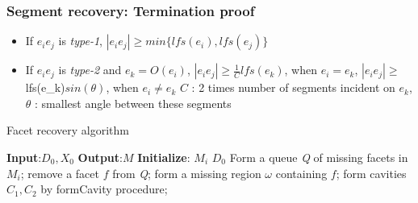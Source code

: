 \documentclass{beamer}
\begin{document}
\begin{frame}
\frametitle{Segment recovery: Termination proof}
\begin{itemize}
    \item If $e_{i}e_{j}$ is \textit{type-1}, \newline
    $|e_{i}e_{j}| \geq min\{lfs(e_i), lfs(e_j)\}$
    \item If $e_{i}e_{j}$ is \textit{type-2} and $e_{k} = O(e_i)$, \newline
    $|e_{i}e_{j}| \geq \frac{1}{C}lfs(e_k)$, when $e_{i} = e_{k}$, \newline
    $|e_{i}e_{j}| \geq $lfs(e_k)$sin(\theta)$, when $e_{i} \ne e_{k}$ \newline
    $C$ : 2 times number of segments incident on $e_k$, \newline
    $\theta$ : smallest angle between these segments
\end{itemize}
\end{frame}

\begin{frame}{Facet recovery algorithm}
\begin{algorithm}[H]
\caption{Facet recovery}
\begin{algorithmic}[1]
\small  {
	\State \textbf{Input}:$D_0, X_0$
	\State \textbf{Output}:$M$
	\State \textbf{Initialize}:
	\State $M_i$ \gets $D_0$
	\Repeat
	\State Form a queue \textit{Q} of missing facets in $M_i$;
	\State remove a facet $f$ from \textit{Q};
	\State form a missing region $\omega$ containing $f$;
	\State form cavities $C_1, C_2$ by formCavity procedure;
	    \State {}
	\EndFor
	\EndWhile
\EndProcedure
}
\end{algorithmic}
\end{algorithm}
\end{frame}

\end{document}
